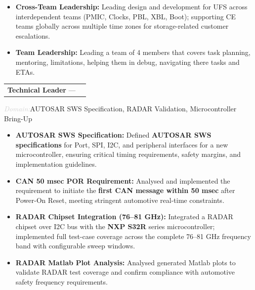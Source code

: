 \documentclass[10pt, a4paper]{article}
\makeatletter
\newcommand{\cventry}[3]{%
  \noindent
  \begin{tabularx}{\linewidth}{@{}X r@{}}
    \textbf{#1} --- \textit{#2} & \textcolor{lightgray}{\small #3}
  \end{tabularx}
  \vspace{2pt}
}
\newcommand{\clientinfo}[2]{%
  \noindent\textcolor{lightgray}{\small\textit{#1:}}\enspace#2\par
}
\makeatother
\begin{document}
\begin{itemize}
  \item \textbf{Cross-Team Leadership:}
        Leading design and development for UFS across interdependent teams
        (PMIC, Clocks, PBL, XBL, Boot); supporting CE teams globally across
        multiple time zones for storage-related customer escalations.

  \item \textbf{Team Leadership:}
        Leading a team of 4 members that covers task planning, mentoring, limitations,
		helping them in debug, navigating there tasks and ETAs.

\end{itemize}

\vspace{4pt}

\cventry{Technical Leader}{\CompanyIV{}}{\CompanyIVExp{}}
\clientinfo{Domain}{AUTOSAR SWS Specification, RADAR Validation, Microcontroller Bring-Up}

\begin{itemize}
  \item \textbf{AUTOSAR SWS Specification:}
        Defined \textbf{AUTOSAR SWS specifications} for Port, SPI, I2C, and
        peripheral interfaces for a new microcontroller, ensuring critical
        timing requirements, safety margins, and implementation guidelines.

  \item \textbf{CAN 50 msec POR Requirement:}
        Analysed and implemented the requirement to initiate the
        \textbf{first CAN message within 50 msec} after Power-On Reset,
        meeting stringent automotive real-time constraints.

  \item \textbf{RADAR Chipset Integration (76--81 GHz):}
        Integrated a RADAR chipset over I2C bus with the \textbf{NXP S32R} series
        microcontroller; implemented full test-case coverage across the complete
        76--81 GHz frequency band with configurable sweep windows.

  \item \textbf{RADAR Matlab Plot Analysis:}
        Analysed generated Matlab plots to validate RADAR test coverage and
        confirm compliance with automotive safety frequency requirements.
\end{itemize}

\vspace{4pt}
\end{document}
